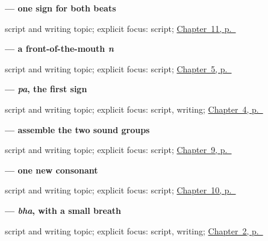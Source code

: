 \noindent\begin{minipage}[t]{\linewidth}
\raggedright
\textbf{ — one sign for both beats}\par
\footnotesize script and writing topic; explicit focus: script; \hyperref[ch:mw-family-seven]{Chapter~11, p.~\pageref*{ch:mw-family-seven}}
\end{minipage}\par\smallskip

\noindent\begin{minipage}[t]{\linewidth}
\raggedright
\textbf{ — a front-of-the-mouth \emph{n}}\par
\footnotesize script and writing topic; explicit focus: script; \hyperref[ch:mw-name-answer]{Chapter~5, p.~\pageref*{ch:mw-name-answer}}
\end{minipage}\par\smallskip

\noindent\begin{minipage}[t]{\linewidth}
\raggedright
\textbf{ — \emph{pa}, the first sign}\par
\footnotesize script and writing topic; explicit focus: script, writing; \hyperref[ch:mw-paani]{Chapter~4, p.~\pageref*{ch:mw-paani}}
\end{minipage}\par\smallskip

\noindent\begin{minipage}[t]{\linewidth}
\raggedright
\textbf{  — assemble the two sound groups}\par
\footnotesize script and writing topic; explicit focus: script; \hyperref[ch:mw-see-you-later]{Chapter~9, p.~\pageref*{ch:mw-see-you-later}}
\end{minipage}\par\smallskip

\noindent\begin{minipage}[t]{\linewidth}
\raggedright
\textbf{ — one new consonant}\par
\footnotesize script and writing topic; explicit focus: script; \hyperref[ch:mw-family-four]{Chapter~10, p.~\pageref*{ch:mw-family-four}}
\end{minipage}\par\smallskip

\noindent\begin{minipage}[t]{\linewidth}
\raggedright
\textbf{ — \emph{bha}, with a small breath}\par
\footnotesize script and writing topic; explicit focus: script, writing; \hyperref[ch:mw-aabhaar]{Chapter~2, p.~\pageref*{ch:mw-aabhaar}}
\end{minipage}\par\smallskip

